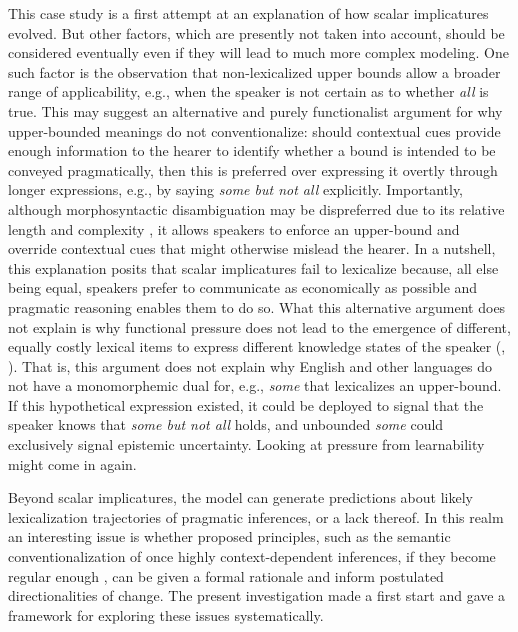 \documentclass[a4paper, 11pt]{article}
\theoremstyle{Satz}
\begin{document}
This case study is a first attempt at an explanation of how scalar implicatures evolved. But
other factors, which are presently not taken into account, should be considered eventually even
if they will lead to much more complex modeling. One such factor is the observation that
non-lexicalized upper bounds allow a broader range of applicability, e.g., when the speaker is
not certain as to whether \emph{all} is true. This may suggest an alternative and purely
functionalist argument for why upper-bounded meanings do not conventionalize: should contextual
cues provide enough information to the hearer to identify whether a bound is intended to be
conveyed pragmatically, then this is preferred over expressing it overtly through longer
expressions, e.g., by saying {\em some but not all} explicitly. Importantly, although
morphosyntactic disambiguation may be dispreferred due to its relative length and complexity
\citep{piantadosi+etal:2012b}, it allows speakers to enforce an upper-bound and override
contextual cues that might otherwise mislead the hearer. In a nutshell, this explanation posits
that scalar implicatures fail to lexicalize because, all else being equal, speakers prefer to
communicate as economically as possible and pragmatic reasoning enables them to do so. What
this alternative argument does not explain is why functional pressure does not lead to the
emergence of different, equally costly lexical items to express different knowledge states of
the speaker (\citealt[252-267]{horn:1984},
\citealt{horn:1972,traugott:2004,vdAuwera:2010}). That is, this argument does not explain why
English and other languages do not have a monomorphemic dual for, e.g., {\em some} that
lexicalizes an upper-bound. If this hypothetical expression existed, it could be deployed to
signal that the speaker knows that {\em some but not all} holds, and unbounded {\em some} could
exclusively signal epistemic uncertainty. Looking at pressure from learnability might come in
again.

Beyond scalar implicatures, the model can generate predictions about likely lexicalization
trajectories of pragmatic inferences, or a lack thereof. In this realm an interesting issue is
whether proposed principles, such as the semantic conventionalization of once highly
context-dependent inferences, if they become regular enough
\citep{levinson:2000,traugott:2004}, can be given a formal rationale and inform postulated
directionalities of change. The present investigation made a first start and gave a framework
for exploring these issues systematically.
\end{document}
